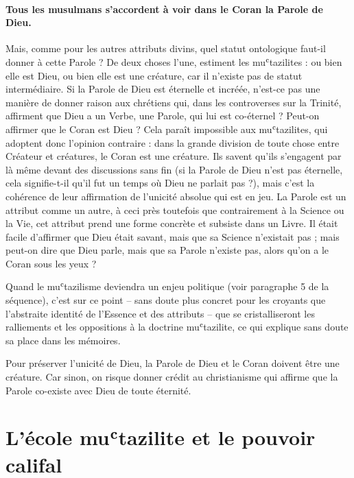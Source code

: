 \paragraph{Tous les musulmans s'accordent à voir dans le Coran la Parole de Dieu.}
Mais, comme pour les autres attributs divins, quel statut ontologique
faut-il donner à cette Parole ? De deux choses l'une, estiment les
muʿtazilites : ou bien elle est Dieu, ou bien elle est une créature, car
il n'existe pas de statut intermédiaire. Si la Parole de Dieu est
éternelle et incréée, n'est-ce pas une manière de donner raison aux
chrétiens qui, dans les controverses sur la Trinité, affirment que Dieu
a un Verbe, une Parole, qui lui est co-éternel ? Peut-on affirmer que le
Coran est Dieu ? Cela paraît impossible aux muʿtazilites, qui adoptent
donc l'opinion contraire : dans la grande division de toute chose entre
Créateur et créatures, le Coran est une créature. Ils savent qu'ils
s'engagent par là même devant des discussions sans fin (si la Parole de
Dieu n'est pas éternelle, cela signifie-t-il qu'il fut un temps où Dieu
ne parlait pas ?), mais c'est la cohérence de leur affirmation de
l'unicité absolue qui est en jeu. La Parole est un attribut comme un
autre, à ceci près toutefois que contrairement à la Science ou la Vie,
cet attribut prend une forme concrète et subsiste dans un Livre. Il
était facile d'affirmer que Dieu était savant, mais que sa Science
n'existait pas ; mais peut-on dire que Dieu parle, mais que sa Parole
n'existe pas, alors qu'on a le Coran sous les yeux ?

Quand le muʿtazilisme deviendra un enjeu politique (voir paragraphe 5 de
la séquence), c'est sur ce point -- sans doute plus concret pour les
croyants que l'abstraite identité de l'Essence et des attributs -- que
se cristalliseront les ralliements et les oppositions à la doctrine
muʿtazilite, ce qui explique sans doute sa place dans les mémoires.


\begin{Synthesis}
Pour préserver l'unicité de Dieu, la Parole de Dieu et le Coran doivent être une créature. Car sinon, on risque donner crédit au christianisme qui affirme que la Parole co-existe avec Dieu de toute éternité. 
\end{Synthesis}

\hypertarget{luxe9cole-muux2bftazilite-et-le-pouvoir-califal}{%
\section{L'école muʿtazilite et le pouvoir
califal}\label{luxe9cole-muux2bftazilite-et-le-pouvoir-califal}}

